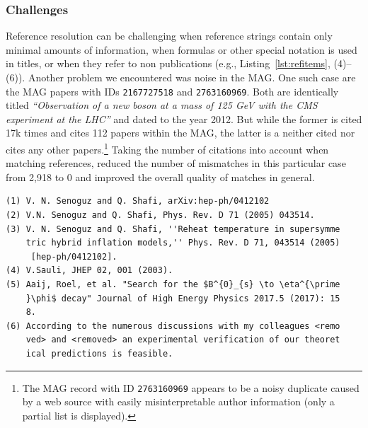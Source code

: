 \subsubsection{Challenges}
Reference resolution can be challenging when reference strings contain only minimal amounts of information, when formulas or other special notation is used in titles, or when they refer to non publications (e.g., Listing~\ref{lst:refitems}, (4)--(6)).  Another problem we encountered was noise in the MAG. One such case are the MAG papers with IDs \texttt{2167727518} and \texttt{2763160969}. Both are identically titled \emph{``Observation of a new boson at a mass of 125 GeV with the CMS experiment at the LHC''} and dated to the year 2012. But while the former is cited 17k times and cites 112 papers within the MAG, the latter is a neither cited nor cites any other papers.\footnote{The MAG record with ID \texttt{2763160969} appears to be a noisy duplicate caused by a web source with easily misinterpretable author information (only a partial list is displayed).} Taking the number of citations into account when matching references, reduced the number of mismatches in this particular case from 2,918 to 0 and improved the overall quality of matches in general.

\begin{lstlisting}[caption={Examples of reference strings},label={lst:refitems}]
(1) V. N. Senoguz and Q. Shafi, arXiv:hep-ph/0412102
(2) V.N. Senoguz and Q. Shafi, Phys. Rev. D 71 (2005) 043514.
(3) V. N. Senoguz and Q. Shafi, ''Reheat temperature in supersymme
    tric hybrid inflation models,'' Phys. Rev. D 71, 043514 (2005)
     [hep-ph/0412102].
(4) V.Sauli, JHEP 02, 001 (2003).
(5) Aaij, Roel, et al. "Search for the $B^{0}_{s} \to \eta^{\prime
    }\phi$ decay" Journal of High Energy Physics 2017.5 (2017): 15
    8.
(6) According to the numerous discussions with my colleagues <remo
    ved> and <removed> an experimental verification of our theoret
    ical predictions is feasible.
\end{lstlisting}


